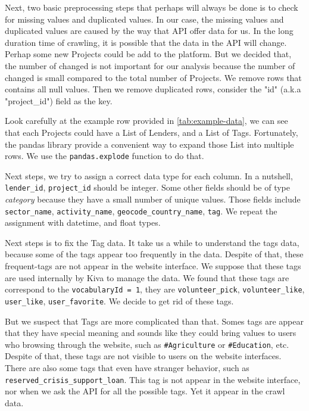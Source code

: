 Next, two basic preprocessing steps that perhaps will always be done is to check for missing values and duplicated values.
In our case, the missing values and duplicated values are caused by the way that API offer data for us.
In the long duration time of crawling, it is possible that the data in the API will change.
Perhap some new Projects could be add to the platform.
But we decided that, the number of changed is not important for our analysis because the number of changed is small compared to the total number of Projects.
We remove rows that contains all null values.
Then we remove duplicated rows, consider the "id" (a.k.a "project\_id") field as the key.

Look carefully at the example row provided in \ref{tab:example-data},
we can see that each Projects could have a List of Lenders, and a List of Tags.
Fortunately, the pandas library provide a convenient way to expand those List into multiple rows.
We use the \lstinline|pandas.explode| function to do that.

Next steps, we try to assign a correct data type for each column.
In a nutshell, \lstinline|lender_id|, \lstinline|project_id| should be integer.
Some other fields should be of type \textit{category} because they have a small number of unique values.
Those fields include \lstinline|sector_name|, \lstinline|activity_name|, \lstinline|geocode_country_name|, \lstinline|tag|.
We repeat the assignment with datetime, and float types.

Next steps is to fix the Tag data.
It take us a while to understand the tags data, because some of the tags appear too frequently in the data.
Despite of that, these frequent-tags are not appear in the website interface.
We suppose that these tags are used internally by Kiva to manage the data.
We found that these tags are correspond to the \lstinline|vocabularyId = 1|,
they are \lstinline|volunteer_pick|, \lstinline|volunteer_like|, \lstinline|user_like|, \lstinline|user_favorite|.
We decide to get rid of these tags.

But we suspect that Tags are more complicated than that.
Somes tags are appear that they have special meaning and sounds like they could bring values to users who browsing through the website,
such as \lstinline|#Agriculture| or \lstinline|#Education|, etc.
Despite of that, these tags are not visible to users on the website interfaces.
There are also some tags that even have stranger behavior, such as \lstinline|reserved_crisis_support_loan|.
This tag is not appear in the website interface, nor when we ask the API for all the possible tags.
Yet it appear in the crawl data.

